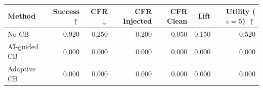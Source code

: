 \begin{tabular}{lrrrrrr}
\toprule
Method & Success $\uparrow$ & CFR $\downarrow$ & CFR Injected & CFR Clean & Lift & Utility ($c=5$) $\uparrow$ \\
\midrule
No CB & 0.920 & 0.250 & 0.200 & 0.050 & 0.150 & 0.520 \\
AI-guided CB & 0.000 & 0.000 & 0.000 & 0.000 & 0.000 & 0.000 \\
Adaptive CB & 0.000 & 0.000 & 0.000 & 0.000 & 0.000 & 0.000 \\
\bottomrule
\end{tabular}
